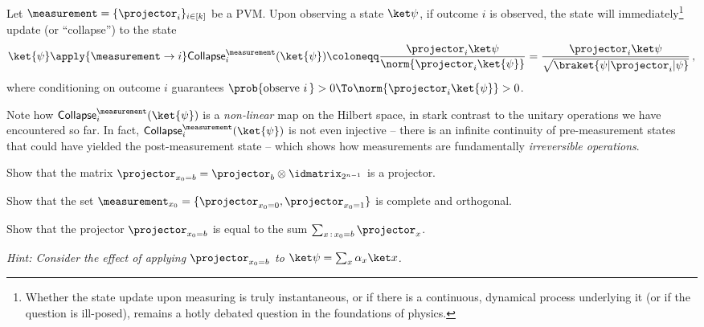       \begin{definition}
        Let $\measurement = \{\projector_{i} \}_{i \in [k]}$ be a PVM.
        Upon observing a state $\ket\psi$, if outcome $i$ is observed,
        the state will immediately\footnote{
          Whether the state update upon measuring is truly
          instantaneous, or if there is a continuous, dynamical
          process underlying it (or if the question is ill-posed), 
          remains a hotly debated question in the foundations of physics.
        }
        update (or ``collapse'') to the state 
        \[
          \ket{\psi} \apply{\measurement \to i} 
          \mathsf{Collapse}^{\measurement}_i(\ket{\psi}) 
          \coloneqq \frac{\projector_i \ket\psi}{\norm{\projector_i \ket{\psi}}}
          = \frac{\projector_i \ket\psi}{\sqrt{\braket{\psi|\projector_i|\psi}}}\, ,
        \]
        where conditioning on outcome $i$ guarantees $\prob{\text{observe } i\, } > 0 \To \norm{\projector_i \ket{\psi}} > 0$.
      \end{definition}
      Note how $\mathsf{Collapse}^{\measurement}_i(\ket{\psi})$ is 
        a \emph{non-linear} map on the Hilbert space, in stark contrast to the
        unitary operations we have encountered so far.
        In fact, $\mathsf{Collapse}^{\measurement}_i(\ket{\psi})$ is 
        not even injective -- there is an infinite continuity of
        pre-measurement states that could have yielded the
        post-measurement state -- which shows how measurements
        are fundamentally \emph{irreversible operations}.

      \begin{exercise}
        \begin{subex}
          \item Show that the matrix $\projector_{x_0=b} = \projector_b \otimes \idmatrix_{2^{n-1}}$ is a projector.
          \item Show that the set $\measurement_{x_0} = \{\projector_{x_0 = 0}, \projector_{x_0 = 1}\}$
            is complete and orthogonal.
          \item Show that the projector $\projector_{x_0=b}$ is equal to the sum
            $\sum_{x\, :\, x_0=b} \projector_x$.
        \end{subex}
        \emph{
          Hint: Consider the effect of applying $\projector_{x_0=b}$ to 
          $\ket\psi = \sum_x \alpha_x \ket x$.
        }
      \end{exercise}

